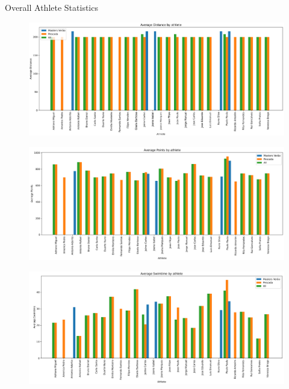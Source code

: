 \documentclass[aspectratio=169, xcolor=dvipsnames]{beamer}
\begin{document}
\begin{frame}[allowframebreaks]{Overall Athlete Statistics}
\begin{figure}
    \centering
    \includegraphics[width=\textwidth]{img/stats/ath1.png}
\end{figure}

\begin{figure}
    \centering
    \includegraphics[width=\textwidth]{img/stats/ath2.png}
\end{figure}

\begin{figure}
    \centering
    \includegraphics[width=\textwidth]{img/stats/ath3.png}
\end{figure}
\end{frame}
\end{document}
